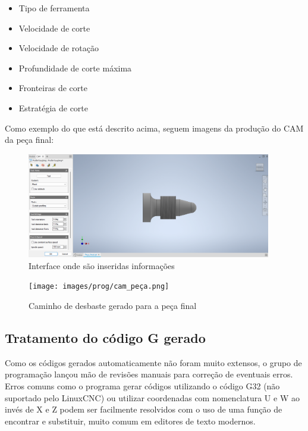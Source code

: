 \begin{itemize}
    \item Tipo de ferramenta
    \item Velocidade de corte
    \item Velocidade de rotação
    \item Profundidade de corte máxima
    \item Fronteiras de corte
    \item Estratégia de corte
\end{itemize}

Como exemplo do que está descrito acima, seguem imagens da produção do CAM da peça final:

\begin{figure}[H]
    \begin{center}
        \includegraphics[width=0.95\textwidth]{images/prog/cam.png}
    \end{center}
    \caption{Interface onde são inseridas informações}\label{inicio_cam}
\end{figure}

\begin{figure}[H]
    \begin{center}
        \texttt{[image: images/prog/cam\_peça.png]}
    \end{center}
    \caption{Caminho de desbaste gerado para a peça final}\label{cam_desbaste}
\end{figure}

\subsection{Tratamento do código G gerado}

Como os códigos gerados automaticamente não foram muito extensos, o grupo de programação lançou mão de revisões manuais para correção de eventuais erros. Erros comuns como o programa gerar códigos utilizando o código G32 (não suportado pelo LinuxCNC) ou utilizar coordenadas com nomenclatura U e W ao invés de X e Z podem ser facilmente resolvidos com o uso de uma função de encontrar e substituir, muito comum em editores de texto modernos. 

